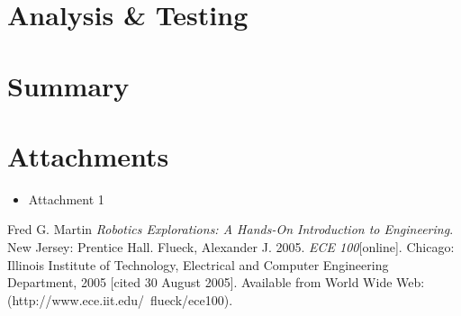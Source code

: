 \documentclass[a4paper, 11pt]{article}
\begin{document}
\section*{Analysis \& Testing} %
\lipsum[6]

\section*{Summary}
\lipsum[7]

\section*{Attachments}
\begin{itemize}
\item Attachment 1
\end{itemize}


\begin{thebibliography}{9}
 Fred G. Martin \emph{Robotics Explorations: A Hands-On Introduction to Engineering}. New Jersey: Prentice Hall.
  Flueck, Alexander J. 2005. \emph{ECE 100}[online]. Chicago: Illinois Institute of Technology, Electrical and Computer Engineering Department, 2005 [cited 30
August 2005]. Available from World Wide Web: (http://www.ece.iit.edu/~flueck/ece100).
\end{thebibliography}
\end{document}
